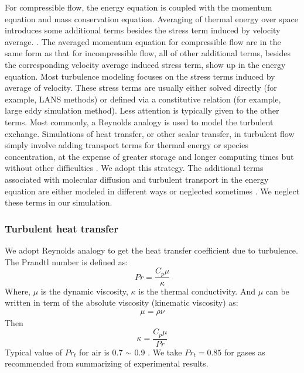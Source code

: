 \documentclass[journal abbreviation, manuscript]{copernicus}
\begin{document}
For compressible flow, the energy equation is coupled with the momentum equation and mass conservation equation. Averaging of thermal energy over space introduces some additional terms besides the stress term induced by velocity average. \citep{NASACompressibleTurbulence}. The averaged momentum equation for compressible flow are in the same form as that for incompressible flow, all of other additional terms, besides the corresponding velocity average induced stress term, show up in the energy equation. Most turbulence modeling focuses on the stress terms induced by average of velocity. These stress terms are usually either solved directly (for example, LANS methods) or defined via a constitutive relation (for example, large eddy simulation method). Less attention is typically given to the other terms. Most commonly, a Reynolds analogy is used to model the turbulent exchange. Simulations of heat transfer, or other scalar transfer, in turbulent flow simply involve adding transport terms for thermal energy or species concentration, at the expense of greater storage and longer computing times but without other difficulties \citep{cebeci2013analysis}. We adopt this strategy. %
The additional terms associated with molecular diffusion and turbulent transport in the energy equation are either modeled in different ways or neglected sometimes \citep{NASACompressibleTurbulence}. We neglect these terms in our simulation.

\subsubsection{Turbulent heat transfer}
We adopt Reynolds analogy to get the heat transfer coefficient due to turbulence.
The Prandtl number is defined as:
\begin{equation}
Pr=\dfrac{C_p \mu}{\kappa}
\end{equation}
Where, $\mu$ is the dynamic viscosity, $\kappa$ is the thermal conductivity. And $\mu$  can be written in term of the absolute viscosity (kinematic viscosity) as:
\begin{align}
\mu=\rho \nu
\end{align}
Then
\begin{equation}
\kappa=\dfrac{C_p \mu}{Pr}
\end{equation}
Typical value of $Pr_t$ for air is 0.7 $\sim$ 0.9 . We take $Pr_t=0.85$ for gases as recommended \citet{kays1994turbulent} from summarizing of experimental results. 
\end{document}
